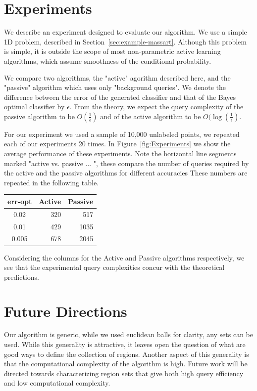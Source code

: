\documentclass[twoside]{article}
\begin{document}
\section{Experiments}

We describe an experiment designed to evaluate our algorithm.
We use a simple 1D problem, described in Section~\ref{sec:example-massart}.
Although this problem is simple, it is outside the scope of most non-parametric active learning algorithms, which assume smoothness of the conditional probability.

We compare two algorithms, the "active" agorithm described here, and the "passive" algorithm which uses only "background queries". We denote the difference between the error of the generated classifier and that of the Bayes optimal classifier by $\epsilon$. From the theory, we expect the query complexity of the passive algorithm to be $O(\frac{1}{\epsilon})$ and of the active algorithm to be $O(\log (\frac{1}{\epsilon})$. 


 For our experiment we used a sample of 10,000 unlabeled points, we repeated each of our experiments 20 times. In Figure~\ref{fig:Experiments} we show the average performance of these experiments. Note the horizontal line segments marked "active vs. passive ... ", these compare the number of queries required by the active and the passive algorithms for different accuracies
 These numbers are repeated in the following table.
\begin{tabular}{|c|rr|}
\hline
err-opt &  Active&  Passive \\
\hline
0.02  &    320 &     517 \\
0.01 &     429 &    1035 \\
0.005 &678 &    2045 \\
\hline
\end{tabular}
Considering the columns for the Active and Passive algorithms respectively, we see that the experimental query complexities concur with the theoretical predictions.

\section{Future Directions}
Our algorithm is generic, while we used euclidean balls for clarity,
any sets can be used. While this generality is attractive, it leaves
open the question of what are good ways to define the collection of
regions. Another aspect of this generality is that the computational
complexity of the algorithm is high. Future work will be directed
towards characterizing region sets that give both high query
efficiency and low computational complexity.
\end{document}
